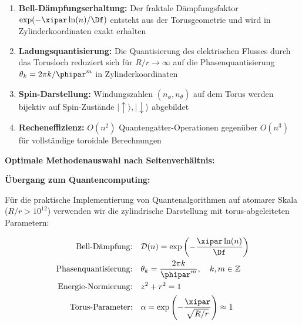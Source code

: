 \begin{enumerate}
	\item \textbf{Bell-Dämpfungserhaltung:} Der fraktale Dämpfungsfaktor 
	$\exp(-\xipar\ln(n)/\Df)$ entsteht aus der Torusgeometrie und wird in 
	Zylinderkoordinaten exakt erhalten
	
	\item \textbf{Ladungsquantisierung:} Die Quantisierung des elektrischen Flusses 
	durch das Torusloch reduziert sich für $R/r \to \infty$ auf die Phasenquantisierung 
	$\theta_k = 2\pi k / \phipar^m$ in Zylinderkoordinaten
	
	\item \textbf{Spin-Darstellung:} Windungszahlen $(n_\phi, n_\theta)$ auf dem 
	Torus werden bijektiv auf Spin-Zustände $|\uparrow\rangle, |\downarrow\rangle$ abgebildet
	
	\item \textbf{Recheneffizienz:} $O(n^2)$ Quantengatter-Operationen gegenüber 
	$O(n^3)$ für vollständige toroidale Berechnungen
\end{enumerate}

\textbf{Optimale Methodenauswahl nach Seitenverhältnis:}

\begin{table}[h]
	\centering
	\caption{Empfohlener Ansatz nach Systemskala}
	\label{tab:method_by_scale}
\end{table}

\textbf{Übergang zum Quantencomputing:}

Für die praktische Implementierung von Quantenalgorithmen auf atomarer Skala 
($R/r > 10^{12}$) verwenden wir die zylindrische Darstellung mit 
torus-abgeleiteten Parametern:

\begin{align}
	\text{Bell-Dämpfung:} \quad & \mathcal{D}(n) = \exp\left(-\frac{\xipar\ln(n)}{\Df}\right) \\
	\text{Phasenquantisierung:} \quad & \theta_k = \frac{2\pi k}{\phipar^m}, \quad k,m \in \mathbb{Z} \\
	\text{Energie-Normierung:} \quad & z^2 + r^2 = 1 \\
	\text{Torus-Parameter:} \quad & \alpha = \exp\left(-\frac{\xipar}{\sqrt{R/r}}\right) \approx 1
\end{align}

